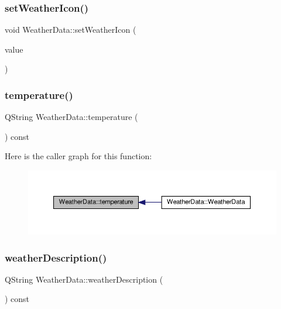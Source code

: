 \subsubsection{\texorpdfstring{set\+Weather\+Icon()}{setWeatherIcon()}}
{\footnotesize\ttfamily void Weather\+Data\+::set\+Weather\+Icon (\begin{DoxyParamCaption}\item[{const Q\+String \&}]{value }\end{DoxyParamCaption})}

\mbox{\label{class_weather_data_a5a193e8410e3a146de59bab224cd88f0}} 
\subsubsection{\texorpdfstring{temperature()}{temperature()}}
{\footnotesize\ttfamily Q\+String Weather\+Data\+::temperature (\begin{DoxyParamCaption}{ }\end{DoxyParamCaption}) const}

Here is the caller graph for this function\+:
\nopagebreak
\begin{figure}[H]
\begin{center}
\leavevmode
\includegraphics[width=350pt]{class_weather_data_a5a193e8410e3a146de59bab224cd88f0_icgraph}
\end{center}
\end{figure}
\mbox{\label{class_weather_data_a63a3528697c8681bd32d4d170ec91f76}} 
\subsubsection{\texorpdfstring{weather\+Description()}{weatherDescription()}}
{\footnotesize\ttfamily Q\+String Weather\+Data\+::weather\+Description (\begin{DoxyParamCaption}{ }\end{DoxyParamCaption}) const}

